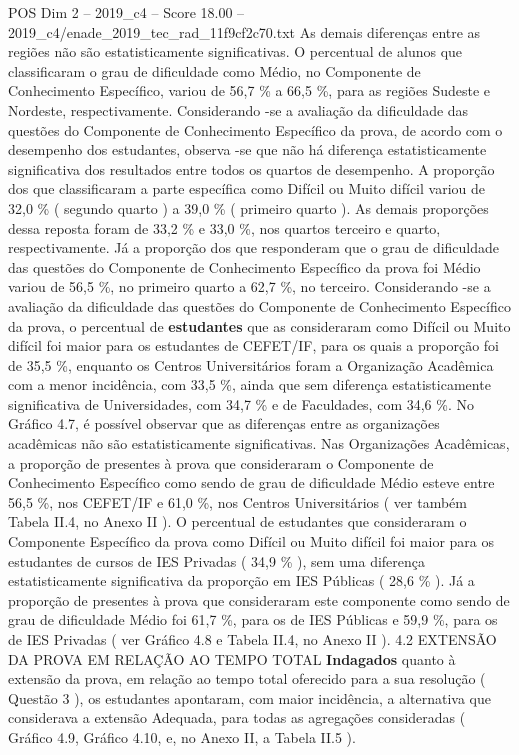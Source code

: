 \begin{textsample}{POS Dim 2 – 2019\_c4 – Score 18.00 – 2019\_c4/enade\_2019\_tec\_rad\_11f9cf2c70.txt}
As demais diferenças entre as regiões não são estatisticamente significativas.
O percentual de alunos que classificaram o grau de dificuldade como Médio, no Componente de Conhecimento Específico, variou de 56,7 \% a 66,5 \%, para as regiões Sudeste e Nordeste, respectivamente.
Considerando -se a avaliação da dificuldade das questões do Componente de Conhecimento Específico da prova, de acordo com o desempenho dos estudantes, observa -se que não há diferença estatisticamente significativa dos resultados entre todos os quartos de desempenho.
A proporção dos que classificaram a parte específica como Difícil ou Muito difícil variou de 32,0 \% ( segundo quarto ) a 39,0 \% ( primeiro quarto ).
As demais proporções dessa reposta foram de 33,2 \% e 33,0 \%, nos quartos terceiro e quarto, respectivamente.
Já a proporção dos que responderam que o grau de dificuldade das questões do Componente de Conhecimento Específico da prova foi Médio variou de 56,5 \%, no primeiro quarto a 62,7 \%, no terceiro.
Considerando -se a avaliação da dificuldade das questões do Componente de Conhecimento Específico da prova, o percentual de \textbf{estudantes} que as consideraram como Difícil ou Muito difícil foi maior para os estudantes de CEFET/IF, para os quais a proporção foi de 35,5 \%, enquanto os Centros Universitários foram a Organização Acadêmica com a menor incidência, com 33,5 \%, ainda que sem diferença estatisticamente significativa de Universidades, com 34,7 \% e de Faculdades, com 34,6 \%.
No Gráfico 4.7, é possível observar que as diferenças entre as organizações acadêmicas não são estatisticamente significativas.
Nas Organizações Acadêmicas, a proporção de presentes à prova que consideraram o Componente de Conhecimento Específico como sendo de grau de dificuldade Médio esteve entre 56,5 \%, nos CEFET/IF e 61,0 \%, nos Centros Universitários ( ver também Tabela II.4, no Anexo II ).
O percentual de estudantes que consideraram o Componente Específico da prova como Difícil ou Muito difícil foi maior para os estudantes de cursos de IES Privadas ( 34,9 \% ), sem uma diferença estatisticamente significativa da proporção em IES Públicas ( 28,6 \% ).
Já a proporção de presentes à prova que consideraram este componente como sendo de grau de dificuldade Médio foi 61,7 \%, para os de IES Públicas e 59,9 \%, para os de IES Privadas ( ver Gráfico 4.8 e Tabela II.4, no Anexo II ). 4.2 EXTENSÃO DA PROVA EM RELAÇÃO AO TEMPO TOTAL \textbf{Indagados} quanto à extensão da prova, em relação ao tempo total oferecido para a sua resolução ( Questão 3 ), os estudantes apontaram, com maior incidência, a alternativa que considerava a extensão Adequada, para todas as agregações consideradas ( Gráfico 4.9, Gráfico 4.10, e, no Anexo II, a Tabela II.5 ).

\end{textsample}
